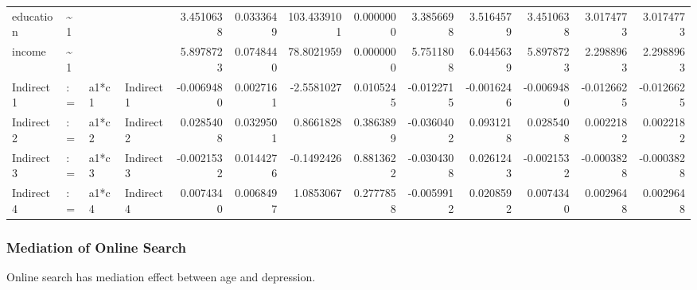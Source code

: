 \documentclass[
]{article}
\begin{document}
\begin{table}[!h]
\begin{tabular}[t]{llllrrrrrrrrr}
\addlinespace
education & \textasciitilde{}1 &  &  & 3.4510638 & 0.0333649 & 103.4339101 & 0.0000000 & 3.3856698 & 3.5164579 & 3.4510638 & 3.0174773 & 3.0174773\\
income & \textasciitilde{}1 &  &  & 5.8978723 & 0.0748440 & 78.8021959 & 0.0000000 & 5.7511808 & 6.0445639 & 5.8978723 & 2.2988963 & 2.2988963\\
Indirect1 & := & a1*c1 & Indirect1 & -0.0069480 & 0.0027161 & -2.5581027 & 0.0105245 & -0.0122715 & -0.0016246 & -0.0069480 & -0.0126625 & -0.0126625\\
Indirect2 & := & a1*c2 & Indirect2 & 0.0285408 & 0.0329501 & 0.8661828 & 0.3863899 & -0.0360402 & 0.0931218 & 0.0285408 & 0.0022182 & 0.0022182\\
Indirect3 & := & a1*c3 & Indirect3 & -0.0021532 & 0.0144276 & -0.1492426 & 0.8813622 & -0.0304308 & 0.0261243 & -0.0021532 & -0.0003828 & -0.0003828\\
\addlinespace
Indirect4 & := & a1*c4 & Indirect4 & 0.0074340 & 0.0068497 & 1.0853067 & 0.2777858 & -0.0059912 & 0.0208592 & 0.0074340 & 0.0029648 & 0.0029648\\
\bottomrule
\end{tabular}
\end{table}

\newpage

\hypertarget{mediation-of-online-search}{%
\subsubsection{Mediation of Online
Search}\label{mediation-of-online-search}}

Online search has mediation effect between age and depression.
\end{document}
